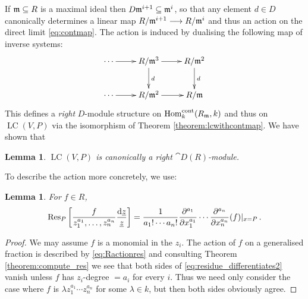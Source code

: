 \documentclass[english,letter paper,12pt,reqno]{article}
\newtheorem{lemma}[theorem]{Lemma}
\theoremstyle{example}
\numberwithin{equation}{section}
\def\Hom{\operatorname{Hom}}
\DeclareMathOperator{\LC}{LC}
\begin{document}
If $\mathfrak{m} \subseteq R$ is a maximal ideal then $D \mathfrak{m}^{i+1} \subseteq \mathfrak{m}^i$, so that any element $d \in D$ canonically determines a linear map $R/\mathfrak{m}^{i+1} \longrightarrow R/\mathfrak{m}^i$ and thus an action on the direct limit \eqref{eq:contmap}. The action is induced by dualising the following map of inverse systems:
\[
\xymatrix{
\cdots \ar[r] & R/\mf{m}^3 \ar[r]\ar[d]^d & R/\mf{m}^2 \ar[d]^d\\
\cdots \ar[r] & R/\mf{m}^2 \ar[r] & R/\mf{m}
}
\]
This defines a \emph{right} $D$-module structure on $\Hom_k^{\cont}(R_{\mf{m}}, k)$ and thus on $\LC(V,P)$ via the isomorphism of Theorem \ref{theorem:lcwithcontmap}. We have shown that

\begin{lemma}\label{lemma:dmodulestructure} $\LC(V,P)$ is canonically a right $\cat{D}(R)$-module.
\end{lemma}

To describe the action more concretely, we use:

\begin{lemma}\label{lemma:residue_differentiates_0} For $f \in R$,
\begin{equation}\label{eq:residue_differentiates2}
\operatorname{Res}\!_P\left[ \frac{f}{z_1^{a_1}, \ldots, z_n^{a_n}} \frac{\operatorname{d}\!{\underline{z}}}{\underline{z}} \right] = \frac{1}{{a_1}! \cdots {a_n}!} \frac{\partial^{a_1}}{\partial x_1^{a_1}} \cdots \frac{\partial^{a_n}}{\partial x_n^{a_n}}(f) |_{x = P}\,.
\end{equation}
\end{lemma}
\begin{proof}
We may assume $f$ is a monomial in the $z_i$. The action of $f$ on a generalised fraction is described by \eqref{eq:Ractionres} and consulting Theorem \ref{theorem:compute_res} we see that both sides of \eqref{eq:residue_differentiates2} vanish unless $f$ has $z_i$-degree $= a_i$ for every $i$. Thus we need only consider the case where $f$ is $\lambda z_1^{a_1} \cdots z_n^{a_n}$ for some $\lambda \in k$, but then both sides obviously agree.
\end{proof}
\end{document}
